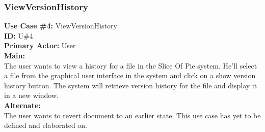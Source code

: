 \subsubsection{ViewVersionHistory}
\textbf{Use Case \#4:} ViewVersionHistory\\
\textbf{ID:} U\#4\\
\newline
\textbf{Primary Actor:} User\\
\textbf{Main:}\\
The user wants to view a history for a file in the Slice Of Pie system. He’ll select a file from the graphical user interface in the system and click on a show version history button. The system will retrieve version history for the file and display it in a new window. \\
\textbf{Alternate:}\\
The user wants to revert document to an earlier state. This use case has yet to be defined and elaborated on.\\
\newpage